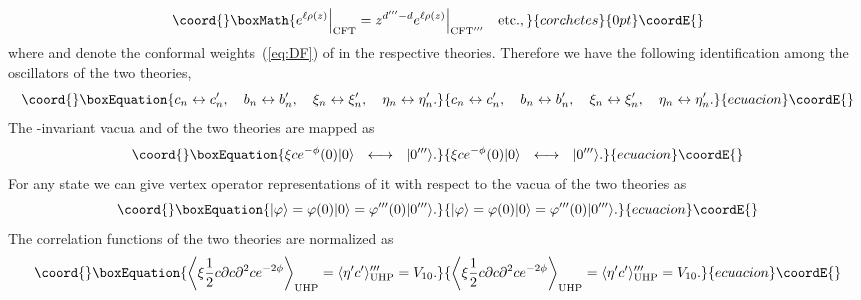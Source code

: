 \documentclass[a4paper,12pt]{article}
\providecommand{\aaru}{\mathbf{R}}
\providecommand{\tp}{\prime\prime\prime}
\begin{document}
\[\coord{}\boxMath{ e^{\ell\rho(z)}\Big|_{\mathrm{CFT}}=z^{d^{\tp}-d}e^{\ell\rho(z)}\Big|_{\mathrm{CFT}^{\tp}}
\quad \mathrm{etc.}, }{corchetes}{0pt}\coordE{}\]
where \coordHE{} and \myHighlight{$d^{\tp}$}\coordHE{} denote the conformal weights~(\ref{eq:DF}) of \coordHE{} in the 
respective theories. Therefore we have the following identification among the oscillators of the 
two theories, 
\begin{equation}\coord{}\boxEquation{
c_n\leftrightarrow c_n^{\prime},\quad b_n\leftrightarrow b_n^{\prime},\quad \xi_n\leftrightarrow
\xi_n^{\prime},\quad \eta_n\leftrightarrow\eta_n^{\prime}. \label{eq:TH}
}{
c_n\leftrightarrow c_n^{\prime},\quad b_n\leftrightarrow b_n^{\prime},\quad \xi_n\leftrightarrow
\xi_n^{\prime},\quad \eta_n\leftrightarrow\eta_n^{\prime}. }{ecuacion}\coordE{}\end{equation}
The \myHighlight{$SL(2,\aaru)$}\coordHE{}-invariant 
vacua \myHighlight{$|0\rangle$}\coordHE{} and \myHighlight{$|0^{\tp}\rangle$}\coordHE{} of the two theories are mapped as 
\begin{equation}\coord{}\boxEquation{
\xi ce^{-\phi}(0)|0\rangle \ \ \longleftrightarrow \ \ |0^{\tp}\rangle. \label{eq:DG}
}{
\xi ce^{-\phi}(0)|0\rangle \ \ \longleftrightarrow \ \ |0^{\tp}\rangle. }{ecuacion}\coordE{}\end{equation}
For any state \myHighlight{$|\varphi\rangle$}\coordHE{} we can give vertex operator representations of it with respect 
to the \myHighlight{$SL(2,\aaru)$}\coordHE{} vacua of the two theories as 
\begin{equation}\coord{}\boxEquation{
|\varphi\rangle=\varphi(0)|0\rangle=\varphi^{\tp}(0)|0^{\tp}\rangle. \label{eq:DH}
}{
|\varphi\rangle=\varphi(0)|0\rangle=\varphi^{\tp}(0)|0^{\tp}\rangle. }{ecuacion}\coordE{}\end{equation}
The correlation functions of the two theories are normalized as 
\begin{equation}\coord{}\boxEquation{
\left\langle\xi\frac{1}{2}c\partial c\partial^2ce^{-2\phi}\right\rangle_{\mathrm{UHP}}
=\langle\eta^{\prime}c^{\prime}\rangle^{\tp}_{\mathrm{UHP}}=V_{10}. \label{eq:DI}
}{
\left\langle\xi\frac{1}{2}c\partial c\partial^2ce^{-2\phi}\right\rangle_{\mathrm{UHP}}
=\langle\eta^{\prime}c^{\prime}\rangle^{\tp}_{\mathrm{UHP}}=V_{10}. }{ecuacion}\coordE{}\end{equation}
\end{document}
